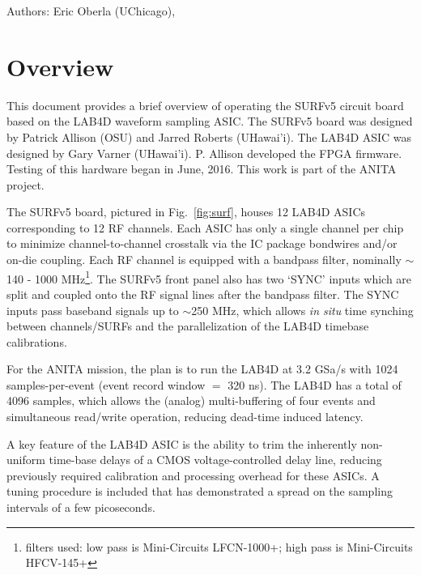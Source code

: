 \documentclass[11pt]{article}
\begin{document}
\noindent Authors: Eric Oberla (UChicago), 

\tableofcontents
\newpage

\section{Overview}

This document provides a brief overview of operating the SURFv5 circuit board based on the LAB4D waveform sampling ASIC. The SURFv5 board was designed by Patrick Allison (OSU) and Jarred Roberts (UHawai'i). The LAB4D ASIC was designed by Gary Varner (UHawai'i). P. Allison developed the FPGA firmware. Testing of this hardware began in June, 2016. This work is part of the ANITA project.

The SURFv5 board, pictured in Fig.~\ref{fig:surf}, houses 12 LAB4D ASICs corresponding to 12 RF channels. Each ASIC has only a single channel per chip to minimize channel-to-channel crosstalk via the IC package bondwires and/or on-die coupling. Each RF channel is equipped with a bandpass filter, nominally $\sim$140 - 1000 MHz\footnote{filters used: low pass is Mini-Circuits LFCN-1000+; high pass is Mini-Circuits HFCV-145+}. The SURFv5 front panel also has two `SYNC' inputs which are split and coupled onto the RF signal lines after the bandpass filter. The SYNC inputs pass baseband signals up to $\sim$250 MHz, which allows {\it in situ} time synching between channels/SURFs and the parallelization of the LAB4D timebase calibrations. 

For the ANITA mission, the plan is to run the LAB4D  at 3.2 GSa/s with 1024 samples-per-event (event record window $=$ 320 ns). The LAB4D has a total of 4096 samples, which allows the (analog) multi-buffering of four events and simultaneous read/write operation, reducing dead-time induced latency.

A key feature of the LAB4D ASIC is the ability to trim the inherently non-uniform time-base delays of a CMOS voltage-controlled delay line, reducing previously required calibration and processing overhead for these ASICs. A tuning procedure is included that has demonstrated a spread on the sampling intervals of a few picoseconds.
\end{document}
